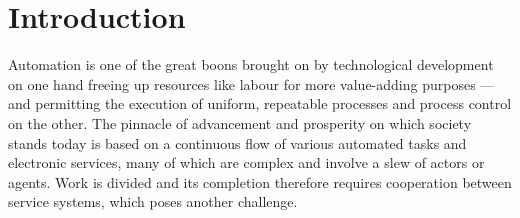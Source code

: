 \documentclass[12pt,a4paper,oneside,pdftex]{report}
\begin{document}
\cleardoublepage
\tableofcontents



\label{pages-prelude}
\cleardoublepage

\startfirstchapter

\pagestyle{headings}


% 
\chapter{Introduction}
\label{chapter:intro}

Automation is one of the great boons brought on by technological development on one hand freeing up resources like labour for more value-adding purposes --- and permitting the execution of uniform, repeatable processes and process control on the other. The pinnacle of advancement and prosperity on which society stands today is based on a continuous flow of various automated tasks and electronic services, many of which are complex and involve a slew of actors or agents. Work is divided and its completion therefore requires cooperation between service systems, which poses another challenge.
\end{document}
